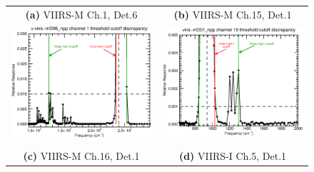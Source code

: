 \begin{figure}[H]
  \centering
  \begin{tabular}{c c}
    \textsf{\textbf{(a)} VIIRS-M Ch.1, Det.6} &
    \textsf{\textbf{(b)} VIIRS-M Ch.15, Det.1} \\
    \includegraphics[bb= 0 15 404 300,clip,scale=0.6]{graphics/v.viirs-mD06_npp-ch1-zoom.eps} &
    \includegraphics[bb=19 15 400 300,clip,scale=0.6]{graphics/viirs-mD01_npp-ch15-zoom.eps} \\\\
    \textsf{\textbf{(c)} VIIRS-M Ch.16, Det.1} &
    \textsf{\textbf{(d)} VIIRS-I Ch.5, Det.1} \\

\end{tabular}
\end{figure}
